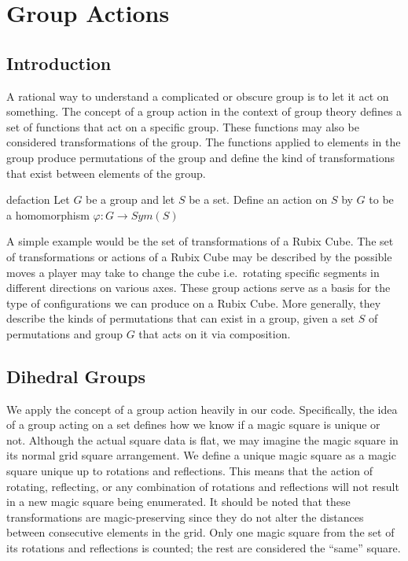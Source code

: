 \documentclass[12pt]{report}
\begin{document}
\chapter{Group Actions}

\section{Introduction}

\par A rational way to understand a complicated or obscure group is to let it act on something. The
concept of a group action in the context of group theory defines a set of functions that act on a
specific group. These functions may also be considered transformations of the group. The functions
applied to elements in the group produce permutations of the group and define the kind of
transformations that exist between elements of the group.

\singlespacing{}
\begin{defbox}{}{defaction}
  Let $G$ be a group and let $S$ be a set. Define an action on $S$ by $G$ to be a homomorphism
  $\varphi:G\rightarrow Sym\left(S\right)$
\end{defbox}
\doublespacing{}

A simple example would be the set of transformations of a Rubix Cube. The set of transformations or
actions of a Rubix Cube may be described by the possible moves a player may take to change the cube
i.e.\ rotating specific segments in different directions on various axes. These group actions serve
as a basis for the type of configurations we can produce on a Rubix Cube. More generally, they
describe the kinds of permutations that can exist in a group, given a set $S$ of permutations and
group $G$ that acts on it via composition.

\section{Dihedral Groups}

\par We apply the concept of a group action heavily in our code. Specifically, the idea of a group
acting on a set defines how we know if a magic square is unique or not. Although the actual square
data is flat, we may imagine the magic square in its normal grid square arrangement. We define a
unique magic square as a magic square unique up to rotations and reflections. This means that the
action of rotating, reflecting, or any combination of rotations and reflections will not result in
a new magic square being enumerated. It should be noted that these transformations are
magic-preserving since they do not alter the distances between consecutive elements in the grid.
Only one magic square from the set of its rotations and reflections is counted; the rest are
considered the ``same'' square.
\end{document}
